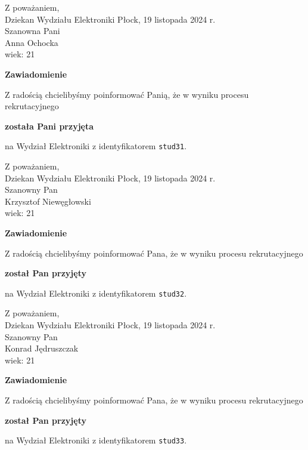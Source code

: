 \documentclass[12pt,a4paper]{article}
\begin{document}
\noindent
Z poważaniem,\\
Dziekan
Wydziału Elektroniki
\newpage
\hfill Płock, 19 listopada 2024 r.\\ 
\noindent 
Szanowna Pani \\
Anna Ochocka \\
wiek: 21

\bigskip

\begin{center}
{\Large\textbf{Zawiadomienie}}
\end{center}
\bigskip
Z radością chcielibyśmy poinformować Panią, że w wyniku procesu rekrutacyjnego
\begin{center}
\textsf{\textbf{została Pani przyjęta}} 
\end{center}
na Wydział Elektroniki z identyfikatorem \verb|stud31|.
\vspace{2cm}

\noindent
Z poważaniem,\\
Dziekan
Wydziału Elektroniki
\newpage
\hfill Płock, 19 listopada 2024 r.\\ 
\noindent 
Szanowny Pan \\
Krzysztof Niewęgłowski \\
wiek: 21

\bigskip

\begin{center}
{\Large\textbf{Zawiadomienie}}
\end{center}
\bigskip
Z radością chcielibyśmy poinformować Pana, że w wyniku procesu rekrutacyjnego
\begin{center}
\textsf{\textbf{został Pan przyjęty}} 
\end{center}
na Wydział Elektroniki z identyfikatorem \verb|stud32|.
\vspace{2cm}

\noindent
Z poważaniem,\\
Dziekan
Wydziału Elektroniki
\newpage
\hfill Płock, 19 listopada 2024 r.\\ 
\noindent 
Szanowny Pan \\
Konrad Jędruszczak \\
wiek: 21

\bigskip

\begin{center}
{\Large\textbf{Zawiadomienie}}
\end{center}
\bigskip
Z radością chcielibyśmy poinformować Pana, że w wyniku procesu rekrutacyjnego
\begin{center}
\textsf{\textbf{został Pan przyjęty}} 
\end{center}
na Wydział Elektroniki z identyfikatorem \verb|stud33|.
\vspace{2cm}
\end{document}
